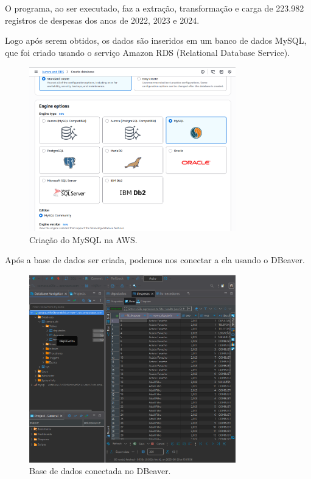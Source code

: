 \documentclass[12pt, a4paper]{article}
\begin{document}
O programa, ao ser executado, faz a extração, transformação e carga de 223.982 registros de despesas dos anos de 2022, 2023 e 2024.

Logo após serem obtidos, os dados são inseridos em um banco de dados MySQL, que foi criado usando o serviço Amazon RDS (Relational Database Service).

\begin{figure}[!htbp]
    \centering
    \includegraphics[width=0.8\textwidth]{assets/1_criacao.png}
    \caption{Criação do MySQL na AWS.}
    \label{fig:criacao_mysql}
\end{figure}
\newpage

Após a base de dados ser criada, podemos nos conectar a ela usando o DBeaver\cite{dbeaver}.

\begin{figure}[!htbp]
    \centering
    \includegraphics[width=0.8\textwidth]{assets/1_dbeaver.png}
    \caption{Base de dados conectada no DBeaver.}
    \label{fig:db conexão}
\end{figure}
\end{document}
